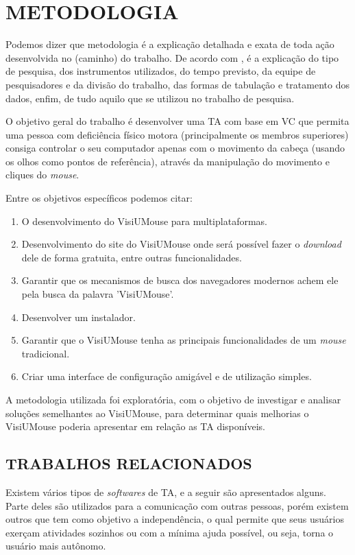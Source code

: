 \chapter{METODOLOGIA}\label{CAP3}

Podemos dizer que metodologia é a explicação detalhada e exata de toda ação desenvolvida no (caminho) do trabalho. De acordo com , é a explicação do tipo de pesquisa, dos instrumentos utilizados, do tempo previsto, da equipe de pesquisadores e da divisão do trabalho, das formas de tabulação e tratamento dos dados, enfim, de tudo aquilo que se utilizou no trabalho de pesquisa.

O objetivo geral do trabalho é desenvolver uma TA com base em VC que permita uma pessoa com deficiência físico motora (principalmente os membros superiores) consiga controlar o seu computador apenas com o movimento da cabeça (usando os olhos como pontos de referência), através da manipulação do movimento e cliques do \textit{mouse}.

Entre os objetivos específicos podemos citar: 
\begin{enumerate}
\item O desenvolvimento do VisiUMouse para multiplataformas.
\item Desenvolvimento do site do VisiUMouse onde será possível fazer o \textit{download} dele de forma gratuita, entre outras funcionalidades.
\item Garantir que os mecanismos de busca dos navegadores modernos achem ele pela busca da palavra 'VisiUMouse'.
\item Desenvolver um instalador.
\item Garantir que o VisiUMouse tenha as principais funcionalidades de um \textit{mouse} tradicional.
\item Criar uma interface de configuração amigável e de utilização simples.
\end{enumerate}

A metodologia utilizada foi exploratória, com o objetivo de investigar e analisar soluções semelhantes ao VisiUMouse, para determinar quais melhorias o VisiUMouse poderia apresentar em relação as TA disponíveis.  
    
\section{TRABALHOS RELACIONADOS}\label{Sub:trabalhos-relacionados}

Existem vários tipos de  \textit{softwares} de TA, e a seguir são apresentados alguns. Parte deles são utilizados para a comunicação com outras pessoas, porém existem outros que tem como objetivo a independência, o qual permite que seus usuários exerçam atividades sozinhos ou com a mínima ajuda possível, ou seja, torna o usuário mais autônomo.

